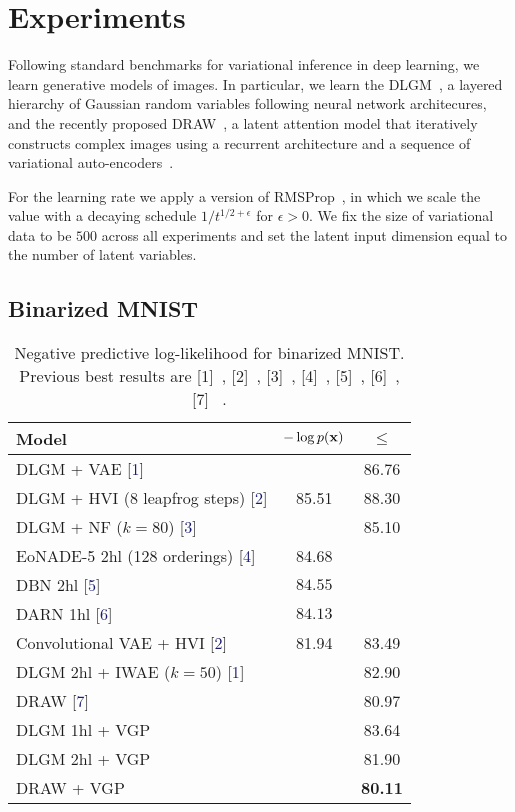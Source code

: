 
\section{Experiments}
\label{sec:experiments}

Following standard benchmarks for variational inference in deep
learning, we learn generative models of images. In particular, we
learn the \gls{DLGM}~\citep{rezende2014stochastic}, a
layered hierarchy of Gaussian random variables following neural network
architecures, and the recently proposed
\gls{DRAW}~\citep{gregor2015draw}, a latent attention model that iteratively
constructs complex images using a recurrent architecture and
a sequence of variational auto-encoders~\citep{kingma2014autoencoding}.

For the learning rate we apply a version of
RMSProp~\citep{tieleman2012rmsprop}, in which we scale the value with
a decaying schedule $1/t^{1/2+\epsilon}$ for
$\epsilon>0$. We fix the
size of variational data to be $500$ across all experiments
and set the latent input dimension equal to the number of
latent variables.

\subsection{Binarized MNIST}

\begin{table}[tb]
\centering
\begin{tabular}{lcc}
\toprule
Model & $-\log p(\boldsymbol{\mathbf{x}})$ & $\le$
\\
\midrule
DLGM + {VAE} [\textcolor{MidnightBlue}{1}] &    & 86.76\\
{DLGM} + HVI (8 leapfrog steps) [\textcolor{MidnightBlue}{2}] & 85.51
& 88.30\\
{DLGM} + NF ($k=80$) [\textcolor{MidnightBlue}{3}] &    & 85.10\\
EoNADE-5 2hl (128 orderings) [\textcolor{MidnightBlue}{4}] & 84.68\\
DBN 2hl [\textcolor{MidnightBlue}{5}] & $84.55$\\
DARN 1hl [\textcolor{MidnightBlue}{6}] & $84.13$\\
Convolutional VAE + HVI [\textcolor{MidnightBlue}{2}] & 81.94 & 83.49\\
{DLGM} 2hl + IWAE ($k=50$) [\textcolor{MidnightBlue}{1}] &    & 82.90\\
DRAW [\textcolor{MidnightBlue}{7}] &    & 80.97\\
\midrule
{DLGM} 1hl + \gls{VGP} &    & 83.64\\
{DLGM} 2hl + \gls{VGP} &    & 81.90\\
DRAW + \gls{VGP} &    & \textbf{80.11}\\
\bottomrule
\end{tabular}
\caption{Negative predictive log-likelihood for binarized MNIST.
Previous best results are
[1]~\citep{burda2015importance},
[2]~\citep{salimans2015markov},
[3]~\citep{rezende2015variational},
[4]~\citep{raiko2014iterative},
[5]~\citep{murray2009evaluating},
[6]~\citep{gregor2014deep},
[7]~\citep{gregor2015draw}%
.}
\label{table:mnist}
\end{table}

